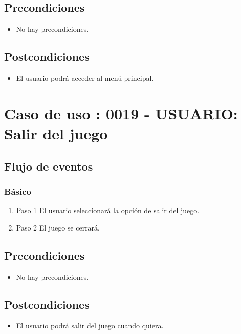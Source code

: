 \subsection{Precondiciones}
\begin{itemize}
\item No hay precondiciones.
\end{itemize}
\subsection{Postcondiciones}
\begin{itemize}
\item El usuario podrá acceder al menú principal.
\end{itemize}



\section{Caso de uso : 0019 - USUARIO: Salir del juego}\label{sec:uc0}

\subsection{Flujo de eventos}

\subsubsection{Básico}

\begin{enumerate}
\item Paso 1
El usuario seleccionará la opción de salir del juego. 
\item Paso 2
El juego se cerrará.
\end{enumerate}

\subsection{Precondiciones}
\begin{itemize}
\item No hay precondiciones.
\end{itemize}
\subsection{Postcondiciones}
\begin{itemize}
\item El usuario podrá salir del juego cuando quiera. 
\end{itemize}




